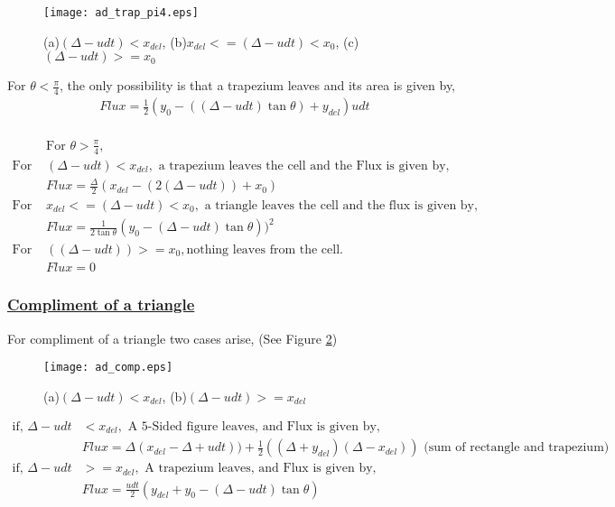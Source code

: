 \begin{figure}%
 \texttt{[image: ad\_trap\_pi4.eps]}
 \caption[Different cases for flux calculation for trapezium]{(a)$(\Delta-udt)<x_{del}$, (b)$x_{del}<=(\Delta-udt)<x_0$, (c)$(\Delta-udt)>=x_0$}
 \label{Fig:trapezium_cases}
\end{figure}

For $\theta<\frac{\pi}{4}$, the only possibility is that a trapezium leaves and its area is given by,
\begin{eqnarray*}
 Flux = \frac{1}{2}( y_0 - ((\Delta - udt) \tan\theta) + y_{del} ) udt \\
\end{eqnarray*}

\begin{equation*}
 \begin{align}
 &\text{For } \theta>\frac{\pi}{4}, \\
 \text{For } &(\Delta-udt)<x_{del},  \text{ a trapezium leaves the cell and the Flux is given by,} \\
&\boxed{ Flux = \frac{\Delta}{2}(x_{del} - (2(\Delta - udt)) + x_0) }\\
 \text{For }  &x_{del}<=(\Delta-udt)<x_0,  \text{ a triangle leaves the cell and the flux is given by,} \\
&\boxed{Flux =\frac{1}{2\tan\theta} (y_0 - (\Delta - udt)\tan\theta))^2} \\
\text{For } & ((\Delta-udt))>=x_0,  \text{nothing leaves from the cell.} \\
&\boxed{Flux =0}
\end{align}
\end{equation*}

\subsubsection{\underline{Compliment of a triangle}}
For compliment of a triangle two cases arise, (See Figure \ref{Fig:compliment_triangle})
\begin{figure}%
 \centering
 \texttt{[image: ad\_comp.eps]}
 \caption[Different cases for flux calculation for compliment of a triangle]{(a)$(\Delta-udt) < x_{del}$, (b)$(\Delta-udt) >= x_{del}$}
 \label{Fig:compliment_triangle}
\end{figure}
\begin{equation*}
\begin{aligned}
\text{if, } \Delta -udt &< x_{del}, \text{ A 5-Sided figure leaves,  and Flux is given by,} \\
&\boxed{Flux = \Delta(x_{del} - \Delta + udt)) + \frac{1}{2}((\Delta + y_{del})(\Delta - x_{del}))} \text{ (sum of rectangle and trapezium)} \\
\text{if, } \Delta -udt &>= x_{del},  \text{ A trapezium leaves, and Flux is given by,} \\
&\boxed{Flux =  \frac{udt}{2}( y_{del} + y_0 - (\Delta - udt)\tan\theta)}
\end{aligned}
\end{equation*}

